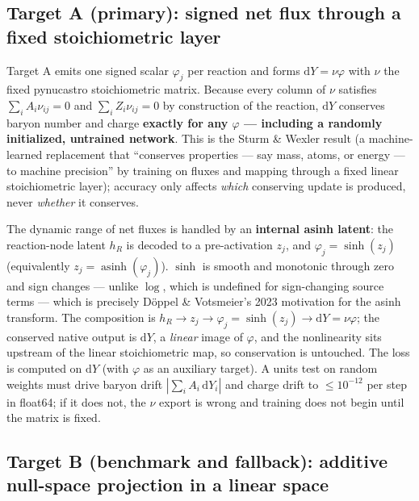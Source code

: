 \documentclass[11pt]{article}
\DeclareMathOperator{\asinh}{asinh}
\newcommand{\dd}{\mathrm{d}}
\begin{document}
\subsection{Target A (primary): signed net flux through a fixed stoichiometric layer}

Target A emits one signed scalar $\varphi_j$ per reaction and forms $\dd Y = \nu\varphi$ with $\nu$ the fixed pynucastro stoichiometric matrix. Because every column of $\nu$ satisfies $\sum_i A_i \nu_{ij} = 0$ and $\sum_i Z_i \nu_{ij} = 0$ by construction of the reaction, $\dd Y$ conserves baryon number and charge \textbf{exactly for any $\varphi$ --- including a randomly initialized, untrained network}. This is the Sturm \& Wexler result (a machine-learned replacement that ``conserves properties --- say mass, atoms, or energy --- to machine precision'' by training on fluxes and mapping through a fixed linear stoichiometric layer); accuracy only affects \emph{which} conserving update is produced, never \emph{whether} it conserves.

The dynamic range of net fluxes is handled by an \textbf{internal asinh latent}: the reaction-node latent $h_R$ is decoded to a pre-activation $z_j$, and $\varphi_j = \sinh(z_j)$ (equivalently $z_j = \asinh(\varphi_j)$). $\sinh$ is smooth and monotonic through zero and sign changes --- unlike $\log$, which is undefined for sign-changing source terms --- which is precisely D\"oppel \& Votsmeier's 2023 motivation for the asinh transform. The composition is $h_R \to z_j \to \varphi_j = \sinh(z_j) \to \dd Y = \nu\varphi$; the conserved native output is $\dd Y$, a \emph{linear} image of $\varphi$, and the nonlinearity sits upstream of the linear stoichiometric map, so conservation is untouched. The loss is computed on $\dd Y$ (with $\varphi$ as an auxiliary target). A units test on random weights must drive baryon drift $|\sum_i A_i\,\dd Y_i|$ and charge drift to $\le 10^{-12}$ per step in float64; if it does not, the $\nu$ export is wrong and training does not begin until the matrix is fixed.

\subsection{Target B (benchmark and fallback): additive null-space projection in a linear space}
\end{document}
